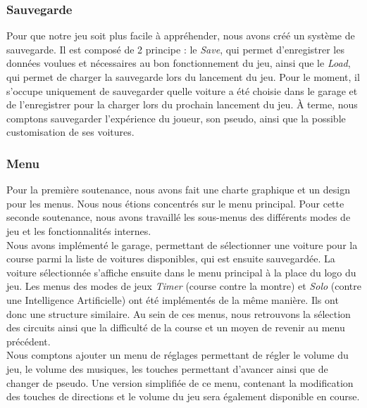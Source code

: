 \documentclass[a4paper,12pt]{article}
\newcommand{\AI}{Intelligence Artificielle}
\begin{document}
            \subsubsection{Sauvegarde}
                Pour que notre jeu soit plus facile à appréhender, nous avons créé un système de 
                sauvegarde. Il est composé de 2 principe : le \textsl{Save}, qui permet d'enregistrer 
                les données voulues et nécessaires au bon fonctionnement du jeu, ainsi que le 
                \textsl{Load}, qui permet de charger la sauvegarde lors du lancement du jeu. Pour le 
                moment, il s'occupe uniquement de sauvegarder quelle voiture a été choisie dans le 
                garage et de l'enregistrer pour la charger lors du prochain lancement du jeu. À terme, 
                nous comptons sauvegarder l'expérience du joueur, son pseudo, ainsi que la possible 
                customisation de ses voitures.

            \subsubsection{Menu}
                Pour la première soutenance, nous avons fait une charte graphique et un design pour les 
                menus.
                Nous nous étions concentrés sur le menu principal. Pour cette seconde soutenance, nous 
                avons travaillé les
                sous-menus des différents modes de jeu et les fonctionnalités internes.\\
                Nous avons implémenté le garage, permettant de
                sélectionner une voiture pour la course parmi la liste de voitures disponibles, qui
                est ensuite sauvegardée. La voiture sélectionnée s'affiche ensuite dans le menu principal
                à la place du logo du jeu. Les menus des modes de
                jeux \textsl{Timer} (course contre la montre) et \textsl{Solo} (contre une \AI) ont
                été implémentés de la même manière. Ils ont donc une structure similaire. Au sein de
                ces menus, nous retrouvons la sélection des circuits ainsi que la difficulté de la course et
                un moyen de revenir au menu précédent.\\
                Nous comptons ajouter un menu de réglages permettant de régler le volume du jeu, le volume
                des musiques, les touches permettant d'avancer ainsi que de changer de pseudo. Une 
                version simplifiée de ce menu, contenant la modification des touches de directions et le
                volume du jeu sera également disponible en course.
\end{document}
